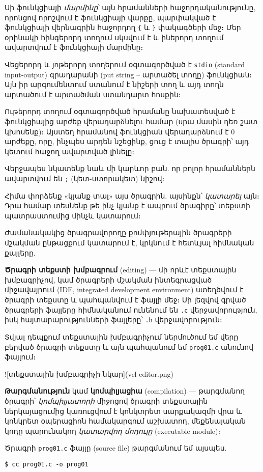Սի ֆունկցիայի \emph{մարմինը}՝ այն հրամանների հաջորդականությունը,
որոնցով որոշվում է ֆունկցիայի վարքը, պարփակված է ֆունկցիայի
վերնագրին հաջորդող \Verb|{| և \Verb|}| փակագծերի մեջ։ Մեր օրինակի
հինգերորդ տողում սկսվում է և իներորդ տողում ավարտվում է
 ֆունկցիայի մարմինը։

Վեցերորդ և յոթերորդ տողերում օգտագործված է \texttt{stdio}
(standard input-output) գրադարանի  (put string --
արտածել տողը) ֆունկցիան։ Այն իր արգումենտում ստանում է նիշերի
տող և այդ տողն արտածում է  արտածման ստանդարտ հոսքին։

Ութերորդ տողում օգտագործված  հրամանը նախատեսված է
ֆունկցիայից արժեք վերադարձնելու համար (սրա մասին դեռ շատ կխոսենք)։
Այստեղ  հրամանով  ֆունկցիան վերադարձնում
է \(0\) արժեքը, որը, ինչպես արդեն նշեցինք, ցուց է տալիս ծրագրի՝
այդ կետում հաջող ավարտված լինելը։

Վերջապես նկատենք նաև մի կարևոր բան. որ բոլոր հրամաններն ավարտվում
են \verb|;| (կետ-ստորակետ) նիշով։

Հիմա փորձենք «կյանք տալ» այս ծրագրին. այսինքն՝ \emph{կատարել} այն։
Դրա համար տեսնենք թե ինչ կյանք է ապրում ծրագիրը՝ տեքստի պատրաստումից
մինչև կատարում։

Ժամանակակից ծրագրավորողը քոմփյութերային ծրագրերի մշակման ընթացքում
կատարում է, կրկնում է հետևյալ հիմնական քայլերը.

\textbf{Ծրագրի տեքստի խմբագրում} (editing) --- մի որևէ տեքստային
խմբագրիչով, կամ ծրագրերի մշակման ինտեգրացված միջավայրում (IDE,
integrated development environment) ստեղծվում է ծրագրի տեքստը և
պահպանվում է ֆայլի մեջ։ Սի լեզվով գրված ծրագրերի ֆայլերը հիմնականում
ունենում են \texttt{.c} վերջավորություն, իսկ հայտարարությունների
ֆայլերը՝ \texttt{.h} վերջավորություն։

Տվյալ դեպքում տեքստային խմբագրիչում ներմուծում եմ վերը բերված ծրագրի
տեքստը և այն պահպանում եմ \texttt{prog01.c} անունով ֆայլում։

![տեքստային-խմբագրիչի-նկար](vcl-editor.png)

\textbf{Թարգմանություն} կամ \textbf{կոմպիլյացիա} (compilation) ---
թարգմանող ծրագրի՝ \emph{կոմպիլյատորի} միջոցով ծրագրի տեքստային
ներկայացումից կառուցվում է կոնկտրետ սարքակազմի վրա և կոնկրետ
օպերացիոն համակարգում աշխատող, մեքենայական կոդը պարունակող
\emph{կատարվող մոդուլը} (executable module)։

Ծրագրի \texttt{prog01.c} ֆայլը (source file) թարգմանում եմ այսպես.

\begin{Verbatim}
$ cc prog01.c -o prog01
\end{Verbatim}

